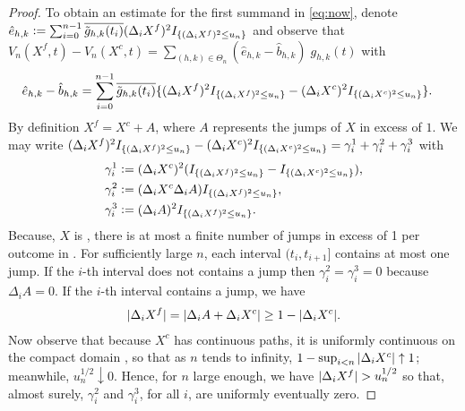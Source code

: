 \begin{proof}
To obtain an estimate for the first summand in \eqref{eq:now}, denote
    $\hat{e}_{h,k} := \sum_{i =0}^{n-1} \overline{\tilde{g}_{h,k}(t_i)} (\Delta_i X^f)^2I_{\{(\Delta_i X^f)^2 \le  u_n\}}$ 
  and observe that 
  $V_n(X^f,t)  - V_n(X^c, t) = \sum_{(h,k) \in \Theta_n} (\hat{e}_{h,k} - \hat{b}_{h,k})\;g_{h,k}(t)$ 
with 
\begin{align}
  \hat{e}_{h,k} - \hat{b}_{h,k}  &= \sum_{i =0}^{n-1} \overline{\tilde{g}_{h,k}(t_i)}\{ (\Delta_i X^f)^2 I_{\{(\Delta_i X^f)^2 \le u_n\}}- (\Delta_i X^c)^2 I_{\{(\Delta_i X^c)^2 \le u_n\}}\}.\notag
  \label{}
\end{align}
By definition $X^f = X^c + A$, where $A$ represents the jumps of $X$ in excess of $1$.  
We may write $ (\Delta_i X^f)^2 I_{\{(\Delta_i X^f)^2 \le u_n\}}- (\Delta_i X^c)^2 I_{\{(\Delta_i X^c)^2 \le u_n\}} = \gamma^1_i + \gamma^2_i + \gamma^3_i$ with 
  \begin{align}
  &\gamma^1_i := (\Delta_i X^c)^2 (I_{\{(\Delta_i X^f)^2 \le u_n\}}-  I_{\{(\Delta_i X^c)^2 \le u_n\}}), \notag \\
  &\gamma^2_i := (\Delta_i X^c \Delta_i A) I_{\{(\Delta_i X^f)^2 \le u_n\}}, \notag\\ 
  &\gamma^3_i := (\Delta_i A)^2 I_{\{(\Delta_i X^f)^2 \le u_n\}}. 
  \end{align}
Because, $X$ is \cadlag, there is at most a finite number of  jumps in excess of 1  per outcome in \domain. For sufficiently large $n$, each interval $(t_{i} , t_{i + 1}]$  contains at most one  jump.  If the $i$-th interval does not contains a jump    then $\gamma^2_i = \gamma^3_i = 0$ because $\Delta_i A = 0$.   If the $i$-th interval contains a jump, we have  
\begin{align}
  \vert\Delta_i X^f\vert = \vert\Delta_i A+ \Delta_i X^c\vert \ge 1 - \vert \Delta_i X^c \vert.\label{eq:well1}
\end{align}
Now observe that because $X^c$ has  continuous paths, it is uniformly continuous on the compact domain \domain, so that   as $n$ tends to infinity, $1 - \sup_{i < n}\vert \Delta_i X^c \vert \uparrow 1$;  meanwhile, $u_n^{1/2} \downarrow 0$. Hence, for $n$ large enough, we have $\vert \Delta_i X^f \vert > u_n^{1/2}$ so that, almost surely,  $\gamma^2_i$ and $\gamma_i^3$, for all $i$,  are uniformly  eventually zero.


\end{proof}
